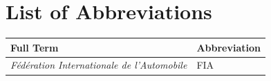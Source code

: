 \chapter*{List of Abbreviations}

\begin{center}
\begin{tabular}{p{}p{}}
\textbf{Full Term} & \textbf{Abbreviation} \\ \hline
\textit{Fédération Internationale de l'Automobile} & FIA \\
\end{tabular}
\end{center}
